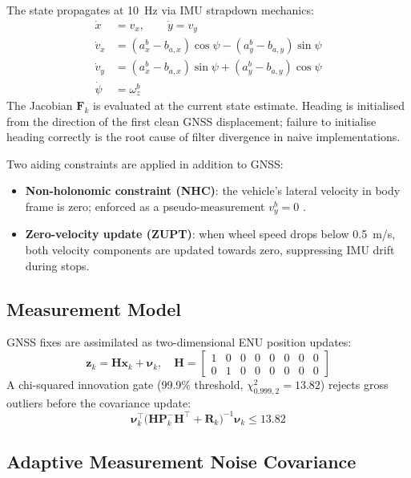 \documentclass[journal]{IEEEtran}
\newcommand{\Rmat}{\mathbf{R}}
\newcommand{\Pmat}{\mathbf{P}}
\newcommand{\Hmat}{\mathbf{H}}
\newcommand{\xvec}{\mathbf{x}}
\newcommand{\zvec}{\mathbf{z}}
\begin{document}
The state propagates at 10~Hz via IMU strapdown mechanics:
\begin{align}
  \dot{x} &= v_x, \qquad \dot{y} = v_y \\
  \dot{v}_x &= (a_x^b - b_{a,x})\cos\psi - (a_y^b - b_{a,y})\sin\psi \\
  \dot{v}_y &= (a_x^b - b_{a,x})\sin\psi + (a_y^b - b_{a,y})\cos\psi \\
  \dot{\psi} &= \omega_z^b
\end{align}
The Jacobian $\mathbf{F}_k$ is evaluated at the current state estimate.
Heading is initialised from the direction of the first clean GNSS
displacement; failure to initialise heading correctly is the root cause
of filter divergence in naive implementations.

Two aiding constraints are applied in addition to GNSS:
\begin{itemize}
  \item \textbf{Non-holonomic constraint (NHC)}: the vehicle's lateral
    velocity in body frame is zero; enforced as a pseudo-measurement
    $v_y^b = 0$ \cite{[AuthorYear_NHC_GNSS]}.
  \item \textbf{Zero-velocity update (ZUPT)}: when wheel speed drops below
    0.5~m/s, both velocity components are updated towards zero, suppressing
    IMU drift during stops.
\end{itemize}

\subsection{Measurement Model}

GNSS fixes are assimilated as two-dimensional ENU position updates:
\begin{equation}
  \zvec_k = \Hmat\xvec_k + \boldsymbol{\nu}_k,
  \quad \Hmat = \begin{bmatrix}1&0&0&0&0&0&0&0\\0&1&0&0&0&0&0&0\end{bmatrix}
\end{equation}
A chi-squared innovation gate (99.9\% threshold, $\chi^2_{0.999,2} = 13.82$)
rejects gross outliers before the covariance update:
\begin{equation}
  \boldsymbol{\nu}_k^\top
  \bigl(\Hmat\Pmat_k^-\Hmat^\top + \Rmat_k\bigr)^{-1}
  \boldsymbol{\nu}_k \leq 13.82
\end{equation}

\subsection{Adaptive Measurement Noise Covariance}
\label{subsec:adaptive_r}
\end{document}
